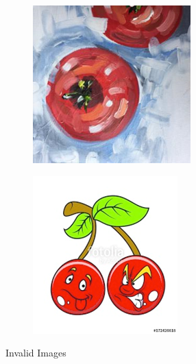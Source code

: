 \documentclass[../main.tex]{subfiles}
\begin{document}
\begin{figure}[h!]
\begin{subfigure}[b]{0.2\linewidth}
  \end{subfigure}
  \begin{subfigure}[b]{0.2\linewidth}
    \includegraphics[width=\linewidth]{02-invalid-fruits/painting.png}
  \end{subfigure}
  \begin{subfigure}[b]{0.2\linewidth}
    \includegraphics[width=\linewidth]{02-invalid-fruits/cartoon.png}
  \end{subfigure}
  \caption{Invalid Images}
  \label{fig:img-invalid}
\end{figure}
\end{document}
